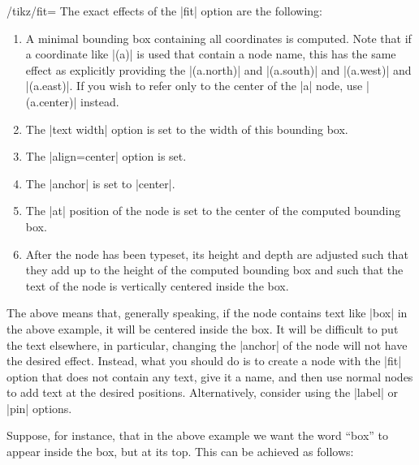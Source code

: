 \begin{key}{/tikz/fit=}
  The exact effects of the |fit| option are the following:
  \begin{enumerate}
  \item A minimal bounding box containing all coordinates is
    computed. Note that if a coordinate like |(a)| is used that
    contain a node name, this has the same effect as explicitly
    providing the |(a.north)| and |(a.south)| and |(a.west)| and
    |(a.east)|. If you wish to refer only to the center of the |a|
    node, use  |(a.center)| instead.
  \item The |text width| option is set to the width of this bounding box.
  \item The |align=center| option is set.
  \item The |anchor| is set to |center|.
  \item The |at| position of the node is set to the center of the
    computed bounding box.
  \item After the node has been typeset, its height and depth are
    adjusted such that they add up to the height of the computed
    bounding box and such that the text of the node is vertically
    centered inside the box.
  \end{enumerate}
  The above means that, generally speaking, if the node contains text
  like |box| in the above example, it will be centered inside the
  box. It will be difficult to put the text elsewhere, in particular,
  changing the |anchor| of the node will not have the desired
  effect. Instead, what you should do is to create a node with the
  |fit| option that does not contain any text, give it a name, and
  then use normal nodes to add text at the desired
  positions. Alternatively, consider using the |label| or |pin|
  options.

  Suppose, for instance, that in the above example we want the word
  ``box'' to appear inside the box, but at its top. This can be
  achieved as follows:
\begin{codeexample}[]
\end{codeexample}


\end{key}
